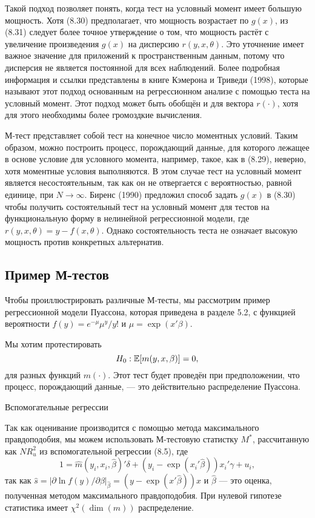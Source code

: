 Такой подход позволяет понять, когда тест на условный момент имеет большую мощность. Хотя (8.30) предполагает, что мощность возрастает по $g(x)$, из (8.31) следует более точное утверждение о том, что мощность растёт с увеличение произведения  $g(x)$ на дисперсию $r(y, x, \theta)$. Это уточнение имеет важное значение для приложений к пространственным данным, потому что дисперсия не является постоянной для всех наблюдений. Более подробная информация и ссылки представлены в книге Кэмерона и Триведи (1998), которые называют этот подход основанным на регрессионном анализе с помощью теста на условный момент. Этот подход может быть обобщён и для вектора $r(\cdot)$, хотя для этого необходимы более громоздкие вычисления.

М-тест представляет собой тест на конечное число моментных условий. Таким образом, можно построить процесс, порождающий данные, для которого лежащее в основе условие для условного момента, например, такое, как в (8.29), неверно, хотя моментные условия выполняются. В этом случае тест на условный момент является несостоятельным, так как он не отвергается с вероятностью, равной единице, при $N \rightarrow \infty$. Биренс (1990) предложил способ задать $g(x)$ в (8.30) чтобы получить состоятельный тест на условный момент для тестов на функциональную форму в нелинейной регрессионной модели, где $r(y, x, \theta) = y - f(x, \theta)$. Однако состоятельность теста не означает высокую мощность против конкретных альтернатив.

\subsection{Пример М-тестов}

Чтобы проиллюстрировать различные М-тесты, мы рассмотрим пример регрессионной модели Пуассона, которая приведена в разделе 5.2, с функцией вероятности $f(y) = e^{-\mu}\mu^y/y!$ и $\mu = \exp(x'\beta)$.

Мы хотим протестировать
\[
H_0: \mathbb{E}[m(y, x, \beta)] = 0,
\]
для разных функций $m(\cdot)$. Этот тест будет проведён при предположении, что процесс, порождающий данные, --- это действительно распределение Пуассона.

\begin{center}
Вспомогательные регрессии
\end{center}

Так как оценивание производится с помощью метода максимального правдоподобия, мы можем использовать М-тестовую статистку $M^*$, рассчитанную как $NR_u^2$ из вспомогательной регрессии (8.5), где
\begin{equation}
1 = \hat{m}(y_i, x_i, \hat{\beta})'\delta + (y_i - \exp(x_i'\hat{\beta}))x_i'\gamma + u_i,
\end{equation}
так как $\hat{s} = |\partial{\ln f(y)}/\partial{\beta}|_{\hat{\beta}} = (y - \exp(x'\hat{\beta}))x$ и $\hat{\beta}$ --- это оценка, полученная методом максимального правдоподобия. При нулевой гипотезе статистика имеет $\chi^2(\dim(m))$ распределение.

